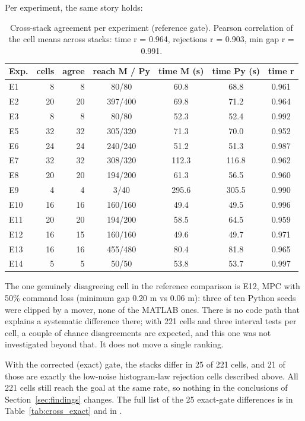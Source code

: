 Per experiment, the same story holds:

\begin{table}[H]
\centering\footnotesize
\begin{tabular}{@{}lrrcccc@{}}
\toprule
\textbf{Exp.} & \textbf{cells} & \textbf{agree} & \textbf{reach M / Py} & \textbf{time M (s)} & \textbf{time Py (s)} & \textbf{time r}\\
\midrule
E1 & 8 & 8 & 80/80 & 60.8 & 68.8 & 0.961\\
E2 & 20 & 20 & 397/400 & 69.8 & 71.2 & 0.964\\
E3 & 8 & 8 & 80/80 & 52.3 & 52.4 & 0.992\\
E5 & 32 & 32 & 305/320 & 71.3 & 70.0 & 0.952\\
E6 & 24 & 24 & 240/240 & 51.2 & 51.3 & 0.987\\
E7 & 32 & 32 & 308/320 & 112.3 & 116.8 & 0.962\\
E8 & 20 & 20 & 194/200 & 61.3 & 56.5 & 0.960\\
E9 & 4 & 4 & 3/40 & 295.6 & 305.5 & 0.990\\
E10 & 16 & 16 & 160/160 & 49.4 & 49.5 & 0.996\\
E11 & 20 & 20 & 194/200 & 58.5 & 64.5 & 0.959\\
E12 & 16 & 15 & 160/160 & 49.6 & 49.7 & 0.971\\
E13 & 16 & 16 & 455/480 & 80.4 & 81.8 & 0.965\\
E14 & 5 & 5 & 50/50 & 53.8 & 53.7 & 0.997\\
\bottomrule
\end{tabular}
\caption{Cross-stack agreement per experiment (reference gate). Pearson
correlation of the cell means across stacks: time r = 0.964, rejections r =
0.903, min gap r = 0.991.}
\label{tab:cross_per}
\end{table}

The one genuinely disagreeing cell in the reference comparison is
E12, MPC with 50\% command loss (minimum gap 0.20 m vs 0.06 m): three of ten
Python seeds were clipped by a mover, none of the MATLAB ones. There is no
code path that explains a systematic difference there; with 221 cells and
three interval tests per cell, a couple of chance disagreements are expected,
and this one was not investigated beyond that. It does not move a single
ranking.

With the corrected (exact) gate, the stacks differ in 25 of 221 cells, and
21 of those are exactly the low-noise histogram-law rejection cells described
above. All 221 cells still reach the goal at the same rate, so nothing in the
conclusions of Section~\ref{sec:findings} changes. The full list of the 25
exact-gate differences is in Table~\ref{tab:cross_exact} and in
.

